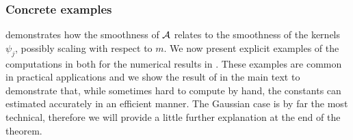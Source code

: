 \documentclass[10pt,a4paper,onecolumn]{article}
\numberwithin{equation}{section}
\begin{document}
\subsubsection{Concrete examples}
 demonstrates how the smoothness of $\mathcal{A}$ relates to the smoothness of the kernels $\psi_j$, possibly scaling with respect to $m$. We now present explicit examples of the computations in both  for the numerical results in . These examples are common in practical applications and we show the result of  in the main text to demonstrate that, while sometimes hard to compute by hand, the constants can estimated accurately in an efficient manner. The Gaussian case is by far the most technical, therefore we will provide a little further explanation at the end of the theorem.
\end{document}

